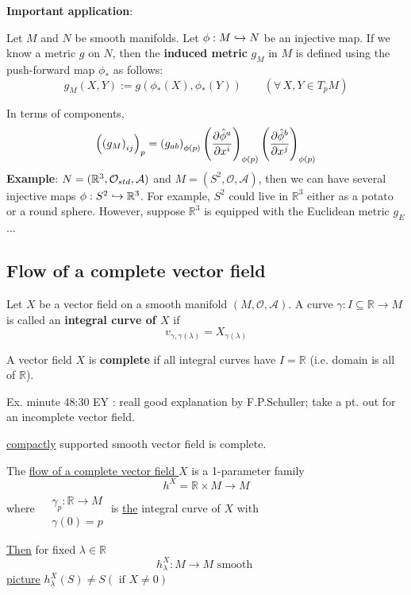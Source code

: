 \textbf{Important application}:
\begin{definition}
Let $M$ and $N$ be smooth manifolds. Let $\phi : M \injmapto N$ be an injective map. If we know a metric $g$ on $N$, then the \textbf{induced metric} $g_M$ in $M$ is defined using the push-forward map $\phi_\ast$ as follows:
\begin{equation}\label{eq_inducedMetric}
\boxed{g_M(X,Y) := g\left(\phi_\ast(X),\phi_\ast(Y)\right)} \quad \quad (\forall \, X, Y \in T_pM)
\end{equation}
\end{definition}
In terms of components,
\begin{equation}
\left(\left(g_M\right)_{ij}\right)_p = \left(g_{ab}\right)_{\phi(p)} \left(\cibasis[\hat{\phi}^a]{x^i}\right)_{\phi(p)} \left(\cibasis[\hat{\phi}^b]{x^j}\right)_{\phi(p)}
\end{equation}
\textbf{Example}: $N = (\mathbb{R}^3, \stdtop, \mathcal{A})$ and $M = (S^2, \mathcal{O}, \mathcal{A})$, then we can have several injective maps $\phi : S^2 \injmapto \mathbb{R}^3$. For example, $S^2$ could live in $\mathbb{R}^3$ either as a potato or a round sphere. However, suppose $\mathbb{R}^3$ is equipped with the Euclidean metric $g_E$ ...

\subsection{Flow of a complete vector field}
\begin{definition}
Let $X$ be a vector field on a smooth manifold $(M,\mathcal{O},\mathcal{A})$. A curve $\gamma : I \subseteq \mathbb{R} \to M$ is called an \textbf{integral curve of $X$} if 
\[
v_{\gamma,\gamma(\lambda)} = X_{\gamma(\lambda)}
\]
\end{definition}

\begin{definition} A vector field $X$ is \textbf{complete} if all integral curves have $I = \mathbb{R}$ (i.e. domain is all of $\mathbb{R}$).
\end{definition}

Ex. minute 48:30 EY : reall good explanation by F.P.Schuller; take a pt. out for an incomplete vector field.

\begin{theorem}
  \underline{compactly} supported smooth vector field is complete.  
\end{theorem}

\begin{definition} The \underline{flow of a complete vector field $X$} is a 1-parameter family
\[
h^X = \mathbb{R}\times M \to M
\]
where $\begin{aligned} & \quad \\ 
  & \gamma_p : \mathbb{R} \to M \\
  & \gamma(0) = p \end{aligned}$ is \underline{the} integral curve of $X$ with 

\underline{Then} for fixed $\lambda \in \mathbb{R}$ 
\[
h_{\lambda}^X : M \to M \text{ smooth }
\]
\underline{picture}  $h^X_{\underline{\lambda}}(S) \neq S (\text{ if } X \neq 0 )$
\end{definition}

